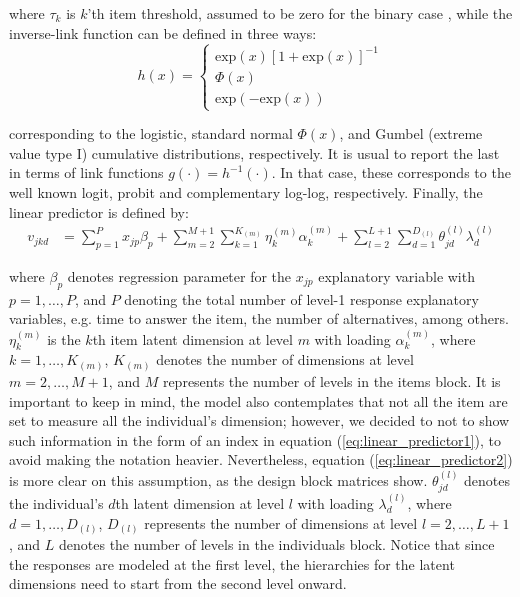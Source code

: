 \noindent where $\tau_{k}$ is $k$'th item threshold, assumed to be zero for the binary case \cite{Rabe_et_al_2004a}, while the inverse-link function can be defined in three ways:
%
\begin{equation} \label{eq:response_dich1}
	h(x) = 
	\begin{cases}
		\text{exp}(x)[1 + \text{exp}(x)]^{-1} \\
		\Phi(x)  \\
		\text{exp}(-\text{exp}(x))
	\end{cases}
\end{equation}

\noindent corresponding to the logistic, standard normal $\Phi(x)$, and Gumbel (extreme value type I) cumulative distributions, respectively. It is usual to report the last in terms of link functions $g(\cdot) = h^{-1}(\cdot)$. In that case, these corresponds to the well known logit, probit and complementary log-log, respectively. Finally, the linear predictor is defined by:
%
\begin{equation} \label{eq:linear_predictor1}
	\begin{split}
		v_{jkd} &= \sum_{p=1}^{P} x_{jp} \beta_{p} + \sum_{m=2}^{M+1} \sum_{k=1}^{K_{(m)}} \eta_{k}^{(m)} \alpha_{k}^{(m)} + \sum_{l=2}^{L+1} \sum_{d=1}^{D_{(l)}} \theta_{jd}^{(l)} \lambda_{d}^{(l)}
	\end{split}
\end{equation}

\noindent where $\beta_{p}$ denotes regression parameter for the $x_{jp}$ explanatory variable with $p=1,\dots, P$, and $P$ denoting the total number of level-1 response explanatory variables, e.g. time to answer the item, the number of alternatives, among others. $\eta_{k}^{(m)}$ is the $k$th item latent dimension at level $m$ with loading $\alpha_{k}^{(m)}$, where $k= 1, \dots, K_{(m)}$, $K_{(m)}$ denotes the number of dimensions at level $m=2,\dots, M+1$, and $M$ represents the number of levels in the items block. It is important to keep in mind, the model also contemplates that not all the item are set to measure all the individual's dimension; however, we decided to not to show such information in the form of an index in equation (\ref{eq:linear_predictor1}), to avoid making the notation heavier. Nevertheless, equation (\ref{eq:linear_predictor2}) is more clear on this assumption, as the design block matrices show. $\theta_{jd}^{(l)}$ denotes the individual's $d$th latent dimension at level $l$ with loading $\lambda_{d}^{(l)}$, where $d=1, \dots, D_{(l)}$, $D_{(l)}$ represents the number of dimensions at level $l=2, \dots, L+1$, and $L$ denotes the number of levels in the individuals block. Notice that since the responses are modeled at the first level, the hierarchies for the latent dimensions need to start from the second level onward.

